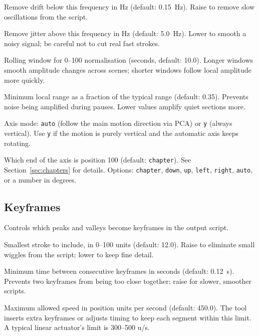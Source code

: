 \documentclass[11pt,a4paper]{article}
\newcommand{\code}[1]{\texttt{#1}}
\begin{document}
\begin{description}[leftmargin=3.5cm, style=nextline]
  \item[\code{--highpass}] Remove drift below this frequency in Hz (default: 0.15~Hz). Raise to remove slow oscillations from the script.
  \item[\code{--lowpass}] Remove jitter above this frequency in Hz (default: 5.0~Hz). Lower to smooth a noisy signal; be careful not to cut real fast strokes.
  \item[\code{--norm-window}] Rolling window for 0--100 normalisation (seconds, default: 10.0). Longer windows smooth amplitude changes across scenes; shorter windows follow local amplitude more quickly.
  \item[\code{--floor}] Minimum local range as a fraction of the typical range (default: 0.35). Prevents noise being amplified during pauses. Lower values amplify quiet sections more.
  \item[\code{--axis}] Axis mode: \code{auto} (follow the main motion direction via PCA) or \code{y} (always vertical). Use \code{y} if the motion is purely vertical and the automatic axis keeps rotating.
  \item[\code{--axis-ref}] Which end of the axis is position 100 (default: \code{chapter}). See Section~\ref{sec:chapters} for details. Options: \code{chapter}, \code{down}, \code{up}, \code{left}, \code{right}, \code{auto}, or a number in degrees.
\end{description}

\subsection{Keyframes}

Controls which peaks and valleys become keyframes in the output script.

\begin{description}[leftmargin=3.5cm, style=nextline]
  \item[\code{--min-amp}] Smallest stroke to include, in 0--100 units (default: 12.0). Raise to eliminate small wiggles from the script; lower to keep fine detail.
  \item[\code{--min-interval}] Minimum time between consecutive keyframes in seconds (default: 0.12~s). Prevents two keyframes from being too close together; raise for slower, smoother scripts.
  \item[\code{--max-speed}] Maximum allowed speed in position units per second (default: 450.0). The tool inserts extra keyframes or adjusts timing to keep each segment within this limit. A typical linear actuator's limit is 300--500 u/s.
\end{description}
\end{document}
